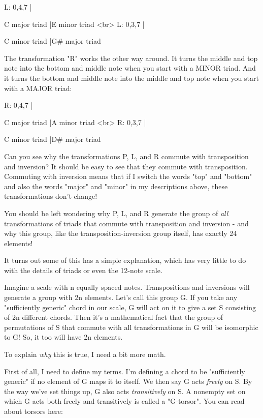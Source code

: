 L: {0,4,7} |        
                  
                  
    C major triad |\to  E minor triad <br>
L: {0,3,7} |       
                  
            
 
      C minor triad |\to  G# major triad

The transformation "R" works the other way around.   It turns the 
middle and top note into the bottom and middle note when you start 
with a MINOR triad.  And it turns the bottom and middle note into 
the middle and top note when you start with a MAJOR triad:

R: {0,4,7} |          
                  
                  
 
   C major triad |\to  A minor triad <br>
R: {0,3,7} |        
                  
                  
    C minor triad |\to  D# major triad

Can you see why the transformations P, L, and R commute with 
transposition and inversion?   It should be easy to see that they 
commute with transposition.  Commuting with inversion means that 
if I switch the words "top" and "bottom" and also the words "major" 
and "minor" in my descriptions above, these transformations don't 
change!

You should be left wondering why P, L, and R generate the group
of \emph{all} transformations of triads that commute with transposition
and inversion - and why this group, like the transposition-inversion
group itself, has exactly 24 elements!  

It turns out some of this has a simple explanation, which has very 
little to do with the details of triads or even the 12-note scale.  
  
Imagine a scale with n equally spaced notes.   Transpositions
and inversions will generate a group with 2n elements.  Let's 
call this group G.  If you take any "sufficiently generic" chord 
in our scale, G will act on it to give a set S consisting of 2n 
different chords.  Then it's a mathematical fact that the group of 
permutations of S that commute with all transformations in G 
will be isomorphic to G!  So, it too will have 2n elements.

To explain \emph{why} this is true, I need a bit more math.

First of all, I need to define my terms.  I'm defining a chord 
to be "sufficiently generic" if no element of G maps it to itself.  
We then say G acts \emph{freely} on S.  By the way we've set 
things up, G also acts \emph{transitively} on S.  A nonempty set on which G 
acts both freely and transitively is called a "G-torsor".  You can 
read about torsors here:

